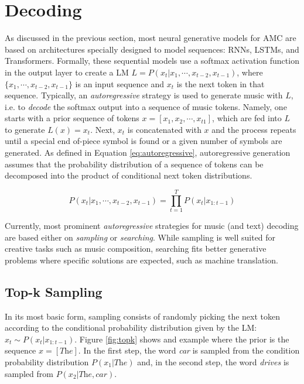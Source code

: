 \section{Decoding}

As discussed in the previous section, most neural generative models for AMC are based on architectures specially designed to model sequences: RNNs, LSTMs, and Transformers. Formally, these sequential models use a softmax activation function in the output layer to create a LM $L = P(x_t|x_1, \cdots, x_{t-2}, x_{t-1})$, where $\{x_1, \cdots, x_{t-2}, x_{t-1}\}$ is an input sequence and $x_t$ is the next token in that sequence. Typically, an \textit{autoregressive} strategy is used to generate music with $L$, i.e. to \textit{decode} the softmax output into a sequence of music tokens. Namely, one starts with a prior sequence of tokens $x = [x_1, x_2, \cdots, x_{t 1}]$, which are fed into $L$ to generate $L(x) = x_{t}$. Next, $x_{t}$ is concatenated with $x$ and the process repeats until a special end of-piece symbol is found or a given number of symbols are generated. As defined in Equation \ref{eq:autoregressive}, autoregressive generation assumes that the probability distribution of a sequence of tokens can be decomposed into the product of conditional next token distributions.

\begin{equation} \label{eq:autoregressive}
    P(x_t|x_1, \cdots, x_{t-2}, x_{t-1}) = \prod_{t=1}^{T} P(x_t|x_{1:t-1})
\end{equation}

Currently, most prominent \textit{autoregressive} strategies for music (and text) decoding are based either on \textit{sampling} or \textit{searching}. While sampling is well suited for creative tasks such as music composition, searching fits better generative problems where specific solutions are expected, such as machine translation.

\subsection{Top-k Sampling}

In its most basic form, sampling consists of randomly picking the next token according to the conditional probability distribution given by the LM: $x_t \sim P(x_t|x_{1:t-1})$. Figure \ref{fig:topk} shows and example where the prior is the sequence $x = [\textit{The}]$. In the first step, the word \textit{car} is sampled from the condition probability distribution $P(x_1 | \textit{The})$ and, in the second step, the word \textit{drives} is sampled from $P(x_2 | \textit{The}, \textit{car})$.

